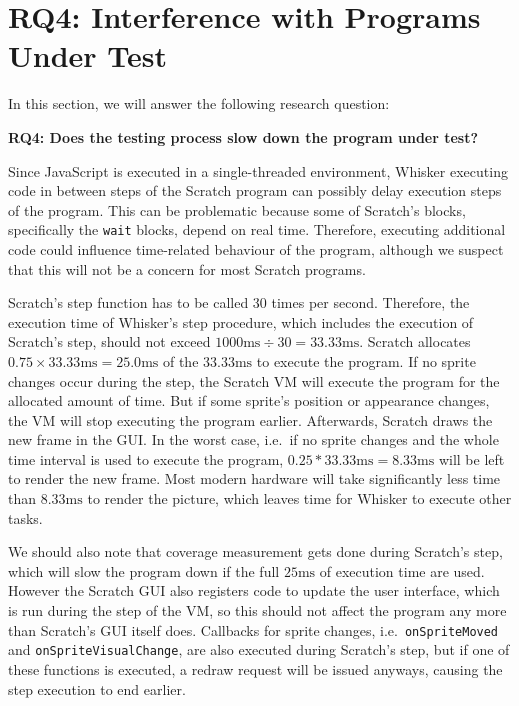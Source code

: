 \section{RQ4: Interference with Programs Under Test}
\label{sec:rq4}

In this section, we will answer the following research question:

\begin{center}\begin{minipage}{.9\textwidth}
    \textbf{RQ4: Does the testing process slow down the program under test?}
\end{minipage}\end{center}

\noindent Since JavaScript is executed in a single-threaded environment,
Whisker executing code in between steps of the Scratch program can possibly delay execution steps of the program.
This can be problematic because some of Scratch's blocks,
specifically the \texttt{wait} blocks, depend on real time.
Therefore, executing additional code could influence time-related behaviour of the program,
although we suspect that this will not be a concern for most Scratch programs.
\parspace

Scratch's step function has to be called 30 times per second.
Therefore, the execution time of Whisker's step procedure, which includes the execution of Scratch's step,
should not exceed $1000\text{ms} \div 30 = 33.33\text{ms}$.
Scratch allocates $0.75 \times 33.33\text{ms} = 25.0\text{ms}$ of the $33.33\text{ms}$ to execute the program.
If no sprite changes occur during the step,
the Scratch VM will execute the program for the allocated amount of time.
But if some sprite's position or appearance changes, the VM will stop executing the program earlier.
Afterwards, Scratch draws the new frame in the GUI.
In the worst case, i.e.\ if no sprite changes and the whole time interval is used to execute the program,
$0.25 * 33.33\text{ms} = 8.33\text{ms}$ will be left to render the new frame.
Most modern hardware will take significantly less time than $8.33\text{ms}$ to render the picture,
which leaves time for Whisker to execute other tasks.
\parspace

We should also note that coverage measurement gets done during Scratch's step,
which will slow the program down if the full $25\text{ms}$ of execution time are used.
However the Scratch GUI also registers code to update the user interface, which is run during the step of the VM,
so this should not affect the program any more than Scratch's GUI itself does.
Callbacks for sprite changes, i.e.\ \texttt{onSpriteMoved} and \texttt{onSpriteVisualChange},
are also executed during Scratch's step, but if one of these functions is executed, a redraw request will be issued anyways,
causing the step execution to end earlier.
\parspace

